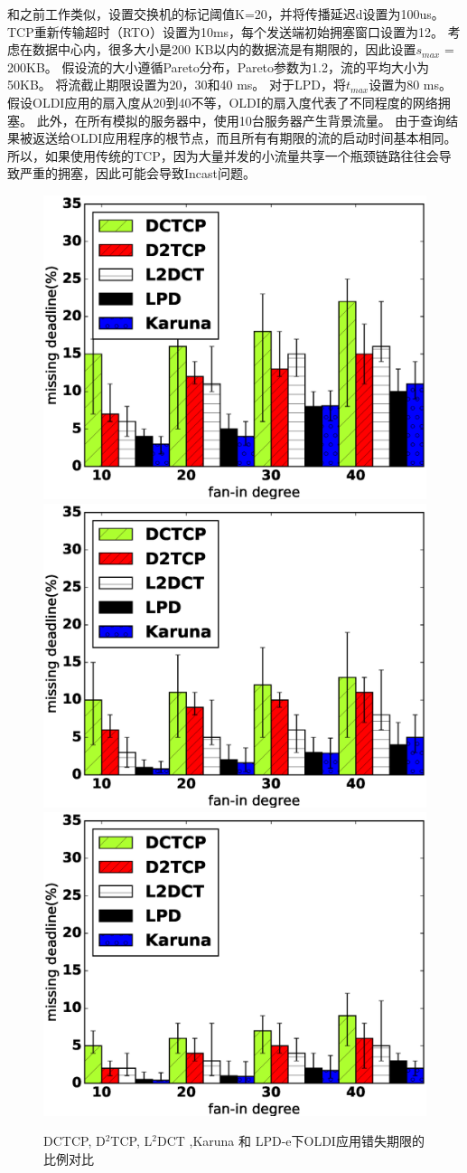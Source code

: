 和之前工作\cite{DCTCP,D2TCP,L2DCT}类似，设置交换机的标记阈值K=20，并将传播延迟d设置为100us。 
TCP重新传输超时（RTO）设置为10ms，每个发送端初始拥塞窗口设置为12。
考虑在数据中心内，很多大小是200 KB以内的数据流是有期限的，因此设置$s_{max}$ = 200KB。
假设流的大小遵循Pareto分布，Pareto参数为1.2，流的平均大小为50KB。
将流截止期限设置为20，30和40 ms。
对于LPD，将$t_{max}$设置为80 ms。
假设OLDI应用的扇入度从20到40不等，OLDI的扇入度代表了不同程度的网络拥塞。
此外，在所有模拟的服务器中，使用10台服务器产生背景流量。
由于查询结果被返送给OLDI应用程序的根节点，而且所有有期限的流的启动时间基本相同。
所以，如果使用传统的TCP，因为大量并发的小流量共享一个瓶颈链路往往会导致严重的拥塞，因此可能会导致Incast问题\cite{Incast08}。

\begin{figure}[h]
\centering
{}
 {\includegraphics[width=0.32\columnwidth]{figures/LPD/old/tight.eps}}
{\includegraphics[width=0.32\columnwidth]{figures/LPD/old/moderate.eps}}
{\includegraphics[width=0.32\columnwidth]{figures/LPD/old/lax.eps}}
\caption{DCTCP, D$^2$TCP, L$^2$DCT ,Karuna 和 LPD-e下OLDI应用错失期限的比例对比}
\label{Incast-dc-top-fig}
\end{figure}


